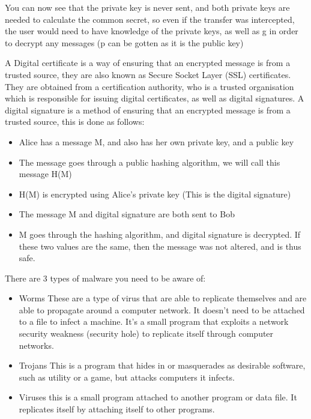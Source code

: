   You can now see that the private key is never sent, and both private keys are needed to calculate the common secret, so even if the transfer was intercepted, the user would need to have knowledge of the private keys, as well as g in order to decrypt any messages (p can be gotten as it is the public key)
  
  A Digital certificate is a way of ensuring that an encrypted message is from a trusted source, they are also known as Secure Socket Layer (SSL) certificates. They are obtained from a certification authority, who is a trusted organisation which is responsible for issuing digital certificates, as well as digital signatures. A digital signature is a method of ensuring that an encrypted message is from a trusted source, this is done as follows:
  \begin{itemize}
  	\item Alice has a message M, and also has her own private key, and a public key
  	\item The message goes through a public hashing algorithm, we will call this message H(M)
  	\item H(M) is encrypted using Alice's private key (This is the digital signature)
  	\item The message M and digital signature are both sent to Bob
  	\item M goes through the hashing algorithm, and digital signature is decrypted. If these two values are the same, then the message was not altered, and is thus safe.
  \end{itemize}
  
  There are 3 types of malware you need to be aware of:
  \begin{itemize}
  	\item Worms
	  	\subitem These are a type of virus that are able to replicate themselves and are able to propagate around a computer network. It doesn't need to be attached to a file to infect a machine. It's a small program that exploits a network security weakness (security hole) to replicate itself through computer networks.
  	\item Trojans
	  	\subitem This is a program that hides in or masquerades as desirable software, such as utility or a game, but attacks computers it infects.
  	\item Viruses
	  	\subitem this is a small program attached to another program or data file. It replicates itself by attaching itself to other programs.
  \end{itemize}
  
